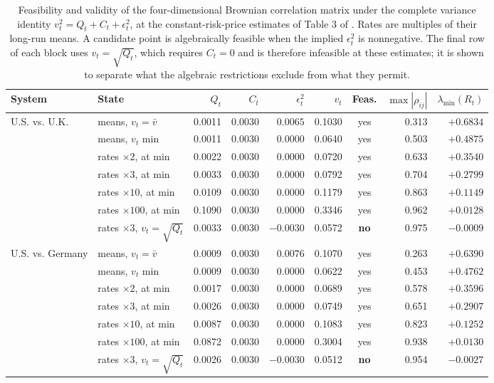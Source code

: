 \documentclass[11pt]{article}
\theoremstyle{definition}
\begin{document}
\begin{table}[htbp]
\centering
\caption{Feasibility and validity of the four-dimensional Brownian correlation matrix under the complete variance identity $v_t^2=Q_t+C_t+\epsilon_t^2$, at the constant-risk-price estimates of Table 3 of \citet{BrandtSantaClara2002}. Rates are multiples of their long-run means. A candidate point is algebraically feasible when the implied $\epsilon_t^2$ is nonnegative. The final row of each block uses $v_t=\sqrt{Q_t}$, which requires $C_t=0$ and is therefore infeasible at these estimates; it is shown to separate what the algebraic restrictions exclude from what they permit.}
\label{tab:correlation_audit}
\footnotesize
\setlength{\tabcolsep}{3pt}
\begin{tabular}{llrrrrcrr}
\toprule
System & State & $Q_t$ & $C_t$ & $\epsilon_t^2$ & $v_t$ & Feas. & $\max|\rho_{ij}|$ & $\lambda_{\min}(R_t)$ \\
\midrule
U.S. vs. U.K.
 & means, $v_t=\bar v$ & 0.0011 & 0.0030 & $0.0065$ & 0.1030 & yes & 0.313 & $+0.6834$ \\
 & means, $v_t$ min & 0.0011 & 0.0030 & $0.0000$ & 0.0640 & yes & 0.503 & $+0.4875$ \\
 & rates $\times2$, at min & 0.0022 & 0.0030 & $0.0000$ & 0.0720 & yes & 0.633 & $+0.3540$ \\
 & rates $\times3$, at min & 0.0033 & 0.0030 & $0.0000$ & 0.0792 & yes & 0.704 & $+0.2799$ \\
 & rates $\times10$, at min & 0.0109 & 0.0030 & $0.0000$ & 0.1179 & yes & 0.863 & $+0.1149$ \\
 & rates $\times100$, at min & 0.1090 & 0.0030 & $0.0000$ & 0.3346 & yes & 0.962 & $+0.0128$ \\
 & rates $\times3$, $v_t=\sqrt{Q_t}$ & 0.0033 & 0.0030 & $-0.0030$ & 0.0572 & \textbf{no} & 0.975 & $-0.0009$ \\
\midrule
U.S. vs. Germany
 & means, $v_t=\bar v$ & 0.0009 & 0.0030 & $0.0076$ & 0.1070 & yes & 0.263 & $+0.6390$ \\
 & means, $v_t$ min & 0.0009 & 0.0030 & $0.0000$ & 0.0622 & yes & 0.453 & $+0.4762$ \\
 & rates $\times2$, at min & 0.0017 & 0.0030 & $0.0000$ & 0.0689 & yes & 0.578 & $+0.3596$ \\
 & rates $\times3$, at min & 0.0026 & 0.0030 & $0.0000$ & 0.0749 & yes & 0.651 & $+0.2907$ \\
 & rates $\times10$, at min & 0.0087 & 0.0030 & $0.0000$ & 0.1083 & yes & 0.823 & $+0.1252$ \\
 & rates $\times100$, at min & 0.0872 & 0.0030 & $0.0000$ & 0.3004 & yes & 0.938 & $+0.0130$ \\
 & rates $\times3$, $v_t=\sqrt{Q_t}$ & 0.0026 & 0.0030 & $-0.0030$ & 0.0512 & \textbf{no} & 0.954 & $-0.0027$ \\
\bottomrule
\end{tabular}
\end{table}
\end{document}
